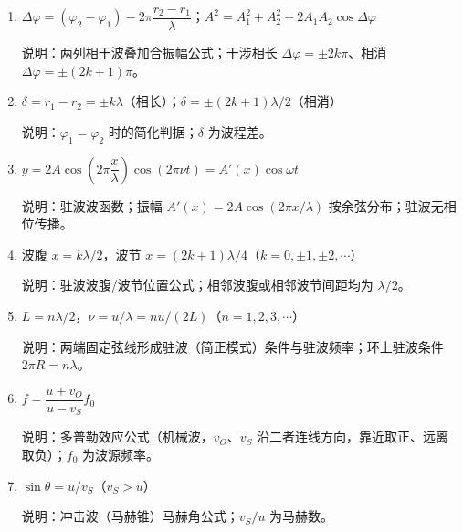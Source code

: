 \documentclass[12pt,a4paper]{ctexart}
\begin{document}
\begin{enumerate}[leftmargin=3em,label=\textbf{公式\arabic*}：,ref=公式\arabic*]
    \item $\Delta\varphi = (\varphi_2-\varphi_1) - 2\pi\dfrac{r_2-r_1}{\lambda}$；$A^2 = A_1^2+A_2^2+2A_1A_2\cos\Delta\varphi$

    说明：两列相干波叠加合振幅公式；干涉相长 $\Delta\varphi = \pm 2k\pi$、相消 $\Delta\varphi = \pm(2k+1)\pi$。

    \item $\delta = r_1-r_2 = \pm k\lambda$（相长）；$\delta = \pm(2k+1)\lambda/2$（相消）

    说明：$\varphi_1=\varphi_2$ 时的简化判据；$\delta$ 为波程差。

    \item $y = 2A\cos\!\left(2\pi\dfrac{x}{\lambda}\right)\cos(2\pi\nu t) = A'(x)\cos\omega t$

    说明：驻波波函数；振幅 $A'(x) = 2A\cos(2\pi x/\lambda)$ 按余弦分布；驻波无相位传播。

    \item 波腹 $x = k\lambda/2$，波节 $x = (2k+1)\lambda/4$（$k=0,\pm 1,\pm 2,\cdots$）

    说明：驻波波腹/波节位置公式；相邻波腹或相邻波节间距均为 $\lambda/2$。

    \item $L = n\lambda/2$，$\nu = u/\lambda = nu/(2L)$（$n=1,2,3,\cdots$）

    说明：两端固定弦线形成驻波（简正模式）条件与驻波频率；环上驻波条件 $2\pi R = n\lambda$。

    \item $f = \dfrac{u+v_O}{u-v_S}f_0$

    说明：多普勒效应公式（机械波，$v_O$、$v_S$ 沿二者连线方向，靠近取正、远离取负）；$f_0$ 为波源频率。

    \item $\sin\theta = u/v_S$（$v_S>u$）

    说明：冲击波（马赫锥）马赫角公式；$v_S/u$ 为马赫数。

\end{enumerate}
\end{document}
